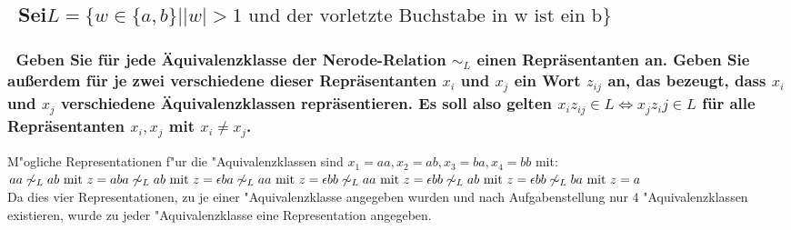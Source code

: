 \documentclass{article}
\newcommand{\gap}{\null\ \\ \\}
\newcommand{\eps}{\epsilon}
\newcommand{\LRA}{\Leftrightarrow}
\renewcommand{\~}{\sim}
\begin{document}
\subsection{\
    Sei$
        L = \{ w \in \{a,b\} 
            | |w| > 1 \text{ und der vorletzte Buchstabe in w ist ein b}
            \}
        $
    }
\subsubsection{\
    Geben Sie für jede Äquivalenzklasse der Nerode-Relation $\~_{L}$ einen 
        Repräsentanten an. Geben Sie außerdem für je zwei verschiedene dieser 
        Repräsentanten $x_i$ und $x_j$ ein Wort $z_{ij}$ an, das bezeugt, dass 
        $x_i$ und $x_j$ verschiedene Äquivalenzklassen repräsentieren.
        Es soll also gelten $x_i z_{ij}  \in L \LRA x_j z_ij \in L$ 
        für alle Repräsentanten $x_i, x_j$ mit $x_i \neq x_j$.
    }
M"ogliche Representationen f"ur die "Aquivalenzklassen sind 
    $x_1 = aa, x_2 = ab, x_3 = ba, x_4 = bb$ mit:$\\
    aa \not \~_{L} ab \text{ mit } z = a\\
    ba \not \~_{L} ab \text{ mit } z = \eps\\
    ba \not \~_{L} aa \text{ mit } z = \eps\\
    bb \not \~_{L} aa \text{ mit } z = \eps\\
    bb \not \~_{L} ab \text{ mit } z = \eps\\
    bb \not \~_{L} ba \text{ mit } z = a\\
    $\\
Da dies vier Representationen, zu je einer "Aquivalenzklasse angegeben wurden 
    und nach Aufgabenstellung nur 4 "Aquivalenzklassen existieren, wurde zu 
    jeder "Aquivalenzklasse eine Representation angegeben.\\
\gap
\end{document}
